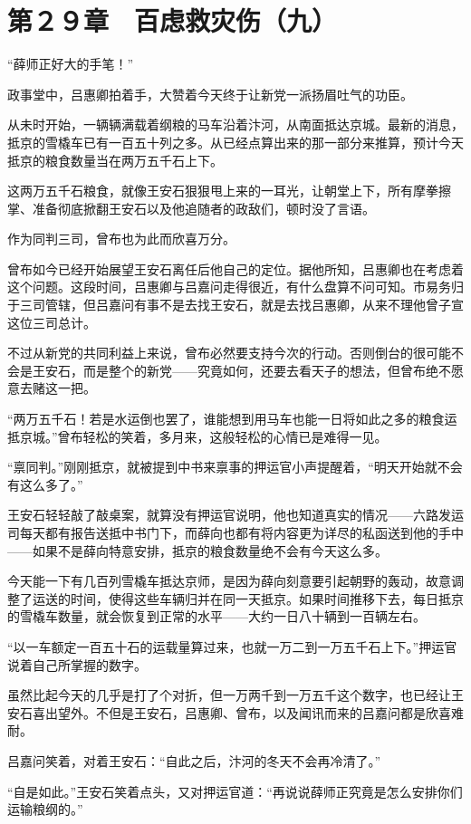 \section{第２９章　百虑救灾伤（九）}

“薛师正好大的手笔！”

政事堂中，吕惠卿拍着手，大赞着今天终于让新党一派扬眉吐气的功臣。

从未时开始，一辆辆满载着纲粮的马车沿着汴河，从南面抵达京城。最新的消息，抵京的雪橇车已有一百五十列之多。从已经点算出来的那一部分来推算，预计今天抵京的粮食数量当在两万五千石上下。

这两万五千石粮食，就像王安石狠狠甩上来的一耳光，让朝堂上下，所有摩拳擦掌、准备彻底掀翻王安石以及他追随者的政敌们，顿时没了言语。

作为同判三司，曾布也为此而欣喜万分。

曾布如今已经开始展望王安石离任后他自己的定位。据他所知，吕惠卿也在考虑着这个问题。这段时间，吕惠卿与吕嘉问走得很近，有什么盘算不问可知。市易务归于三司管辖，但吕嘉问有事不是去找王安石，就是去找吕惠卿，从来不理他曾子宣这位三司总计。

不过从新党的共同利益上来说，曾布必然要支持今次的行动。否则倒台的很可能不会是王安石，而是整个的新党——究竟如何，还要去看天子的想法，但曾布绝不愿意去赌这一把。

“两万五千石！若是水运倒也罢了，谁能想到用马车也能一日将如此之多的粮食运抵京城。”曾布轻松的笑着，多月来，这般轻松的心情已是难得一见。

“禀同判。”刚刚抵京，就被提到中书来禀事的押运官小声提醒着，“明天开始就不会有这么多了。”

王安石轻轻敲了敲桌案，就算没有押运官说明，他也知道真实的情况——六路发运司每天都有报告送抵中书门下，而薛向也都有将内容更为详尽的私函送到他的手中——如果不是薛向特意安排，抵京的粮食数量绝不会有今天这么多。

今天能一下有几百列雪橇车抵达京师，是因为薛向刻意要引起朝野的轰动，故意调整了运送的时间，使得这些车辆归并在同一天抵京。如果时间推移下去，每日抵京的雪橇车数量，就会恢复到正常的水平——大约一日八十辆到一百辆左右。

“以一车额定一百五十石的运载量算过来，也就一万二到一万五千石上下。”押运官说着自己所掌握的数字。

虽然比起今天的几乎是打了个对折，但一万两千到一万五千这个数字，也已经让王安石喜出望外。不但是王安石，吕惠卿、曾布，以及闻讯而来的吕嘉问都是欣喜难耐。

吕嘉问笑着，对着王安石：“自此之后，汴河的冬天不会再冷清了。”

“自是如此。”王安石笑着点头，又对押运官道：“再说说薛师正究竟是怎么安排你们运输粮纲的。”

